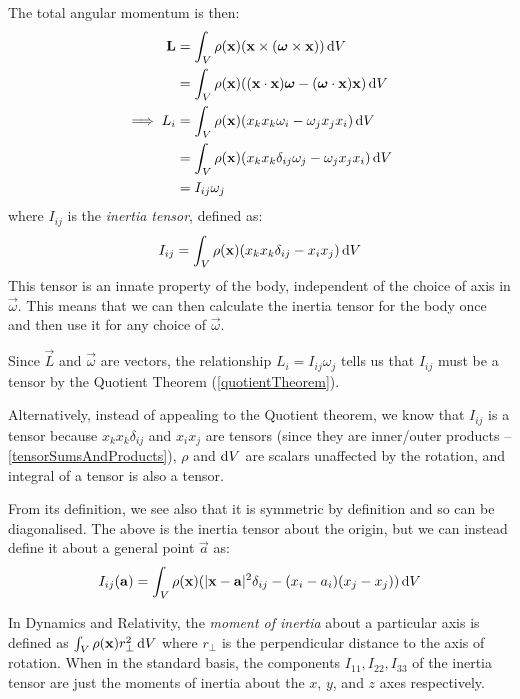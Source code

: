 \documentclass[../main.tex]{subfiles}
\begin{document}
The total angular momentum is then:
\begin{align*}
  \vec{L} &= \int_{V} \rho(\vec{x})(\vec{x} \times (\vec{\omega} \times \vec{x})) \d{V} \\
          &= \int_{V} \rho(\vec{x})((\vec{x} \cdot \vec{x})\vec{\omega} - (\vec{\omega} \cdot \vec{x})\vec{x}) \d{V} \\
  \implies L_i &= \int_{V} \rho(\vec{x}) (x_k x_k \omega_i - \omega_j x_j x_i)\d{V} \\
               &= \int_{V} \rho(\vec{x}) (x_k x_k \delta_{i j} \omega_j - \omega_j x_j x_i)\d{V} \\
               &= I_{i j}\omega_j
\end{align*}
where $I_{i j}$ is the \textit{inertia tensor}, defined as:
\[
  I_{i j} = \int_{V} \rho(\vec{x})(x_k x_k \delta_{i j} - x_ix_j) \d{V}
\]
This tensor is an innate property of the body, independent of the choice of axis in $\vec{\omega}$.
This means that we can then calculate the inertia tensor for the body once and then use it for any choice of $\vec{\omega}$.

Since $\vec{L}$ and $\vec{\omega}$ are vectors, the relationship $L_i = I_{i j}\omega_j$ tells us that $I_{i j}$ must be a tensor by the Quotient Theorem (\cref{quotientTheorem}).
\begin{remark}
  Alternatively, instead of appealing to the Quotient theorem, we know that $I_{i j}$ is a tensor because $x_k x_k \delta_{i j}$ and $x_i x_j$ are tensors (since they are inner/outer products -- \cref{tensorSumsAndProducts}), $\rho$ and $\d{V}$ are scalars unaffected by the rotation, and integral of a tensor is also a tensor.
\end{remark}
From its definition, we see also that it is symmetric by definition and so can be diagonalised.
The above is the inertia tensor about the origin, but we can instead define it about a general point $\vec{a}$ as:
\[
  I_{i j}(\vec{a}) = \int_{V} \rho(\vec{x})(|\vec{x} - \vec{a}|^2 \delta_{i j} - (x_i - a_i)(x_j - x_j)) \d{V}
\]
\begin{remark}[Note]
  In Dynamics and Relativity, the \textit{moment of inertia} about a particular axis is defined as $\int_{V} \rho(\vec{x})r_{\perp}^2 \d{V}$ where $r_{\perp}$ is the perpendicular distance to the axis of rotation.
  When in the standard basis, the components $I_{1 1}, I_{2 2}, I_{3 3}$ of the inertia tensor are just the moments of inertia about the $x$, $y$, and $z$ axes respectively.
\end{remark}
\end{document}
